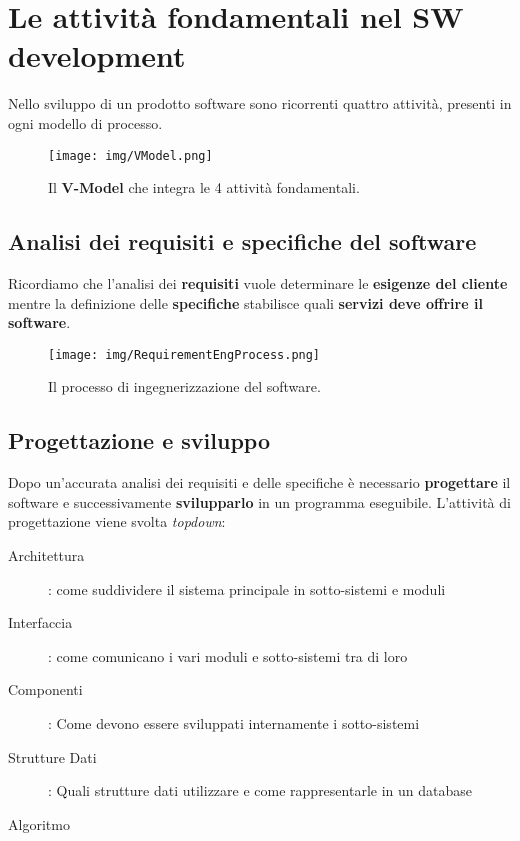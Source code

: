 \newpage
\section{Le attivit\`a fondamentali nel SW development}

Nello sviluppo di un prodotto software sono ricorrenti quattro
attivit\`a, presenti in ogni modello di processo.

\begin{figure}[H]
    \centering
    \texttt{[image: img/VModel.png]}
    \caption*{Il \textbf{V-Model} che integra le 4 attivit\`a
    fondamentali.}
\end{figure}

\subsection{Analisi dei requisiti e specifiche del software}

Ricordiamo che l'analisi dei \textbf{requisiti} vuole determinare
le \textbf{esigenze del cliente} mentre la definizione delle
\textbf{specifiche} stabilisce quali \textbf{servizi deve offrire
il software}.

\begin{figure}[H]
    \centering
    \texttt{[image: img/RequirementEngProcess.png]}
    \caption*{Il processo di ingegnerizzazione del software.}
\end{figure}


\subsection{Progettazione e sviluppo}

Dopo un'accurata analisi dei requisiti e delle specifiche \`e
necessario \textbf{progettare} il software e successivamente
\textbf{svilupparlo} in un programma eseguibile. L'attivit\`a
di progettazione viene svolta \textit{topdown}:

\begin{description}
    \item[Architettura]: come suddividere il sistema principale
                        in sotto-sistemi e moduli

    \item[Interfaccia]: come comunicano i vari moduli e sotto-sistemi
                        tra di loro

    \item[Componenti]:  Come devono essere sviluppati internamente
                        i sotto-sistemi

    \item[Strutture Dati]: Quali strutture dati utilizzare e come
                            rappresentarle in un database

    \item[Algoritmo]
\end{description}

